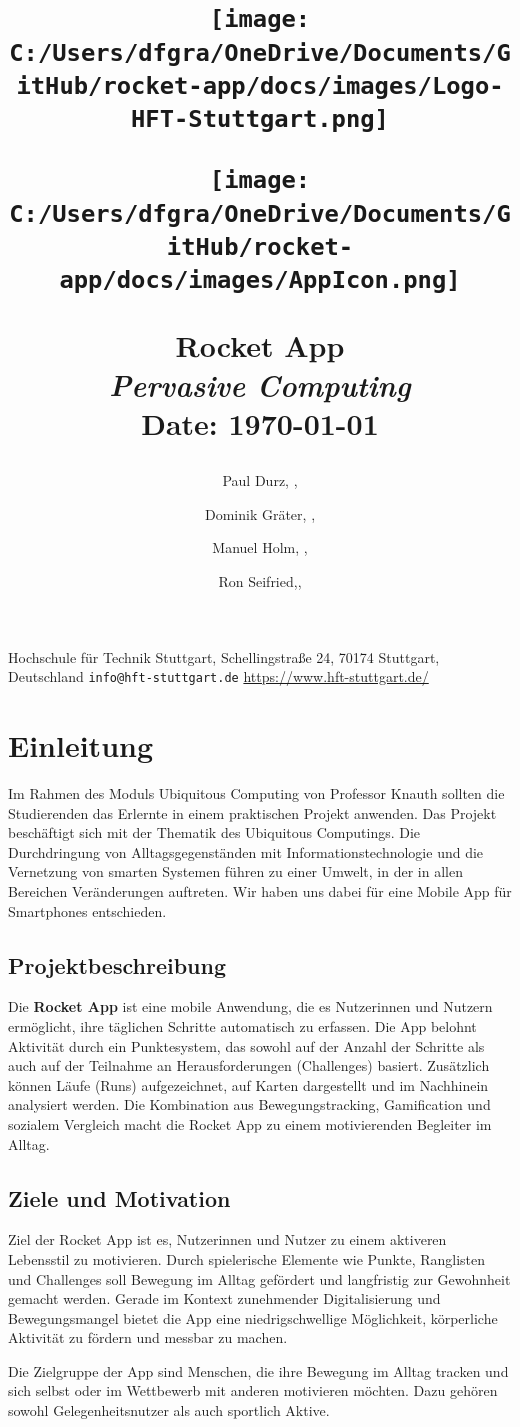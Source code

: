\documentclass[11pt,a4paper]{article}
\title{
    \begin{flushright}
        \texttt{[image: C:/Users/dfgra/OneDrive/Documents/GitHub/rocket-app/docs/images/Logo-HFT-Stuttgart.png]}
    \end{flushright}
    \begin{center}
    {\huge \thetitle \par}
        \vspace{1.5cm}
        \texttt{[image: C:/Users/dfgra/OneDrive/Documents/GitHub/rocket-app/docs/images/AppIcon.png]} %
        \vfill
        {\Large \theauthor \par}
        {\large \thedate \par}
    \end{center}
    \vspace{2cm}
    \Huge\textbf{Rocket App} \\
    \LARGE\textit{Pervasive Computing} \\
    \vspace{2cm}
    \large Date: \today \\
    \vfill
}
\author{
    Paul Durz, \id{1005080}, \email{22dupa1bif@hft-stuttgaet.de}
    \and
    Dominik Gräter, \id{1005093}, \email{22grdo1bif@hft-stuttgart.de}
    \and
    Manuel Holm, \id{1005094}, \email{22homa1bif@hft-stuttgart.de}
    \and
    Ron Seifried,\id{1005466}, \email{22sero1bif@hft-stuttgart.de}
}
\newcommand{\email}[1]{\texttt{#1}}
\newcommand{\institute}[1]{\par\medskip\centering #1\par\medskip}
\begin{document}
\maketitle
\institute{
    Hochschule für Technik Stuttgart, Schellingstraße 24, 70174 Stuttgart, Deutschland
    \email{info@hft-stuttgart.de}
    \url{https://www.hft-stuttgart.de/}
}
\newpage
\tableofcontents
\newpage

\section{Einleitung}
Im Rahmen des Moduls Ubiquitous Computing von Professor Knauth sollten die
Studierenden das Erlernte in einem praktischen Projekt anwenden.
Das Projekt beschäftigt sich mit der Thematik des Ubiquitous Computings. Die
Durchdringung von Alltagsgegenständen mit Informationstechnologie und die
Vernetzung von smarten Systemen führen zu einer Umwelt, in der in allen Bereichen
Veränderungen auftreten. Wir haben uns dabei für eine Mobile App für Smartphones entschieden.

\subsection{Projektbeschreibung}
Die \textbf{Rocket App} ist eine mobile Anwendung, die es Nutzerinnen und Nutzern ermöglicht, ihre täglichen Schritte automatisch zu erfassen. Die App belohnt Aktivität durch ein Punktesystem, das sowohl auf der Anzahl der Schritte als auch auf der Teilnahme an Herausforderungen (Challenges) basiert. Zusätzlich können Läufe (Runs) aufgezeichnet, auf Karten dargestellt und im Nachhinein analysiert werden. Die Kombination aus Bewegungstracking, Gamification und sozialem Vergleich macht die Rocket App zu einem motivierenden Begleiter im Alltag.

\subsection{Ziele und Motivation}
Ziel der Rocket App ist es, Nutzerinnen und Nutzer zu einem aktiveren Lebensstil zu motivieren. Durch spielerische Elemente wie Punkte, Ranglisten und Challenges soll Bewegung im Alltag gefördert und langfristig zur Gewohnheit gemacht werden. Gerade im Kontext zunehmender Digitalisierung und Bewegungsmangel bietet die App eine niedrigschwellige Möglichkeit, körperliche Aktivität zu fördern und messbar zu machen.

Die Zielgruppe der App sind Menschen, die ihre Bewegung im Alltag tracken und sich selbst oder im Wettbewerb mit anderen motivieren möchten. Dazu gehören sowohl Gelegenheitsnutzer als auch sportlich Aktive.
\end{document}
